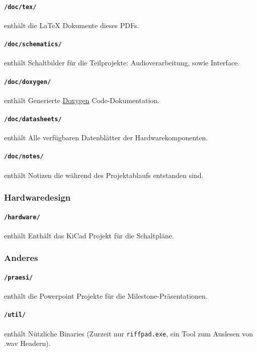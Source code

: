\paragraph{\texttt{/doc/tex/}} enthält die LaTeX Dokumente dieses PDFs.

\paragraph{\texttt{/doc/schematics/}} enthält Schaltbilder für die Teilprojekte: Audioverarbeitung, sowie Interface.

\paragraph{\texttt{/doc/doxygen/}} enthält Generierte \hyperlink{https://www.doxygen.nl/index.html}{Doxygen} Code-Dokumentation.

\paragraph{\texttt{/doc/datasheets/}} enthält Alle verfügbaren Datenblätter der Hardwarekomponenten.

\paragraph{\texttt{/doc/notes/}} enthält Notizen die während des Projektablaufs entstanden sind.

\subsubsection{Hardwaredesign}

\paragraph{\texttt{/hardware/}} enthält Enthält das KiCad Projekt für die Schaltpläne.

\subsubsection{Anderes}

\paragraph{\texttt{/praesi/}} enthält die Powerpoint Projekte für die Milestone-Präsentationen.

\paragraph{\texttt{/util/}} enthält Nützliche Binaries (Zurzeit nur \texttt{riffpad.exe}, ein Tool zum Auslesen von .wav Headern).


